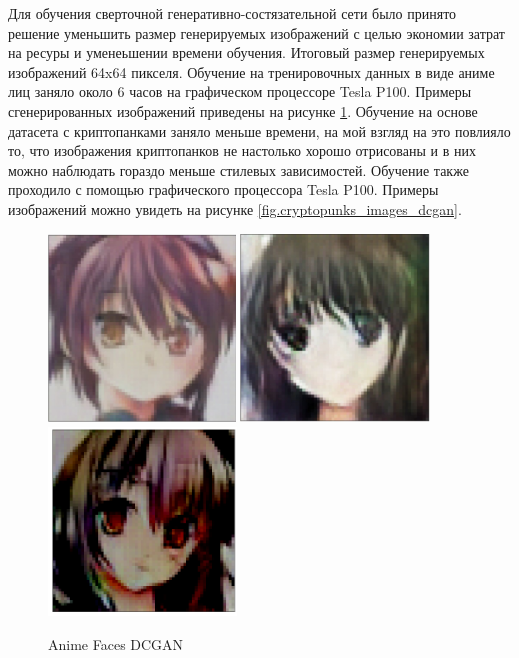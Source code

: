 Для обучения сверточной генеративно-состязательной сети было принято решение уменьшить размер генерируемых изображений с целью экономии затрат на ресуры и уменеьшении времени обучения. Итоговый размер генерируемых изображений 64x64 пикселя. Обучение на тренировочных данных в виде аниме лиц заняло около 6 часов на графическом процессоре Tesla P100. Примеры сгенерированных изображений приведены на рисунке {\color{blue} \ref{fig.anime_girls_dcgan}}.
Обучение на основе датасета с криптопанками заняло меньше времени, на мой взгляд на это повлияло то, что изображения криптопанков не настолько хорошо отрисованы и в них можно наблюдать гораздо меньше стилевых зависимостей. Обучение также проходило с помощью графического процессора Tesla P100. Примеры изображений можно увидеть на рисунке {\color{blue} \ref{fig.cryptopunks_images_dcgan}}.
\begin{figure}
    \centering
    \includegraphics[height=50mm, width=.3\textwidth]{fig/anime_girl_1_example_dcgan.png}\hfill
    \includegraphics[height=50mm, width=.3\textwidth]{fig/anime_girl_2_example_dcgan.png}\hfill
    \includegraphics[height=50mm, width=.3\textwidth]{fig/anime_girl_3_example_dcgan.png}
    \caption{Anime Faces DCGAN}
    \label{fig.anime_girls_dcgan}
\end{figure}

